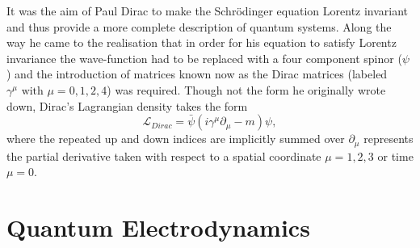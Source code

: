 It was the aim of Paul Dirac to make the Schr\"odinger equation Lorentz
invariant and thus provide a more complete description of quantum systems. Along
the way he came to the realisation that in order for his equation to satisfy
Lorentz invariance the wave-function had to be replaced with a four component
spinor ($\psi$) and the introduction of matrices known now as the Dirac matrices
(labeled $\gamma^{\mu} \text{ with } \mu=0,1,2,4$) was required. Though not the
form he originally wrote down, Dirac's Lagrangian density takes the form
\begin{equation}
    \label{eq:dirac} \mathcal{L}_{Dirac} =
\bar{\psi}(i\gamma^{\mu}\partial_{\mu} - m)\psi,
\end{equation} where the repeated up and down indices are implicitly summed
over $\partial_{\mu}$ represents the partial derivative taken with respect to a
spatial coordinate $\mu = 1,2,3$ or time $\mu = 0$.

\section{Quantum Electrodynamics}

